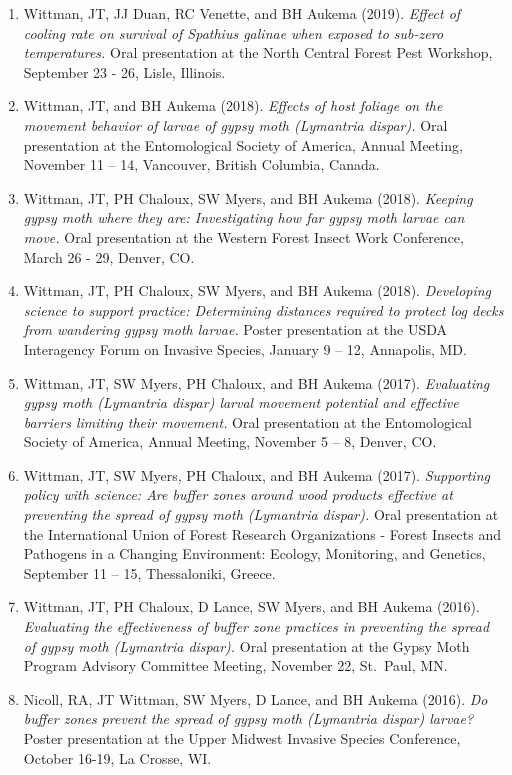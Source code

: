 \documentclass[11pt, a4paper]{awesome-cv}
\providecommand{\tightlist}{%
	\setlength{\itemsep}{0pt}\setlength{\parskip}{0pt}}
\begin{document}
\begin{enumerate}
\def\labelenumi{\arabic{enumi}.}
\tightlist
\item
  Wittman, JT, JJ Duan, RC Venette, and BH Aukema (2019). \emph{Effect of cooling rate on survival of Spathius galinae when exposed to sub-zero temperatures.} Oral presentation at the North Central Forest Pest Workshop, September 23 - 26, Lisle, Illinois.
\item
  Wittman, JT, and BH Aukema (2018). \emph{Effects of host foliage on the movement behavior of larvae of gypsy moth (Lymantria dispar).} Oral presentation at the Entomological Society of America, Annual Meeting, November 11 -- 14, Vancouver, British Columbia, Canada.
\item
  Wittman, JT, PH Chaloux, SW Myers, and BH Aukema (2018). \emph{Keeping gypsy moth where they are: Investigating how far gypsy moth larvae can move.} Oral presentation at the Western Forest Insect Work Conference, March 26 - 29, Denver, CO.
\item
  Wittman, JT, PH Chaloux, SW Myers, and BH Aukema (2018). \emph{Developing science to support practice: Determining distances required to protect log decks from wandering gypsy moth larvae.} Poster presentation at the USDA Interagency Forum on Invasive Species, January 9 -- 12, Annapolis, MD.
\item
  Wittman, JT, SW Myers, PH Chaloux, and BH Aukema (2017). \emph{Evaluating gypsy moth (Lymantria dispar) larval movement potential and effective barriers limiting their movement.} Oral presentation at the Entomological Society of America, Annual Meeting, November 5 -- 8, Denver, CO.
\item
  Wittman, JT, SW Myers, PH Chaloux, and BH Aukema (2017). \emph{Supporting policy with science: Are buffer zones around wood products effective at preventing the spread of gypsy moth (Lymantria dispar).} Oral presentation at the International Union of Forest Research Organizations - Forest Insects and Pathogens in a Changing Environment: Ecology, Monitoring, and Genetics, September 11 -- 15, Thessaloniki, Greece.
\item
  Wittman, JT, PH Chaloux, D Lance, SW Myers, and BH Aukema (2016). \emph{Evaluating the effectiveness of buffer zone practices in preventing the spread of gypsy moth (Lymantria dispar).} Oral presentation at the Gypsy Moth Program Advisory Committee Meeting, November 22, St.~Paul, MN.
\item
  Nicoll, RA, JT Wittman, SW Myers, D Lance, and BH Aukema (2016). \emph{Do buffer zones prevent the spread of gypsy moth (\emph{Lymantria dispar}) larvae?} Poster presentation at the Upper Midwest Invasive Species Conference, October 16-19, La Crosse, WI.

\end{enumerate}
\end{document}
